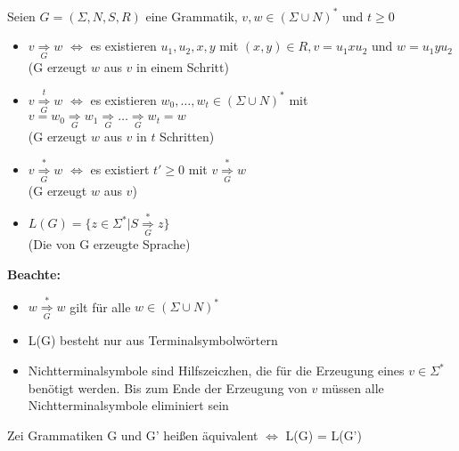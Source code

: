 \documentclass[14pt]{article}
\begin{document}
\begin{definition} 
    Seien $G =  (\varSigma, N, S, R)$ eine Grammatik, $v, w \in (\varSigma \cup N)^*$
    und $t \geq 0$
    \begin{itemize}
        \item $v \underset{G}{\Rightarrow} w$ $\Leftrightarrow$ es existieren $u_1, u_2, x, y$ 
        mit $(x, y) \in R, v = u_1xu_2$ und $w = u_1yu_2$ \\
        (G erzeugt $w$ aus $v$ in einem Schritt)
        \item $v \underset{G} {\overset{t}{\Rightarrow}} w$ $\Leftrightarrow$
        es existieren $w_0, \dots, w_t \in (\varSigma \cup N)^*$ mit \\
        $v = w_0 \underset{G}{\Rightarrow} w_1 \underset{G}{\Rightarrow} \dots 
        \underset{G}{\Rightarrow} w_t = w$ \\
        (G erzeugt $w$ aus $v$ in $t$ Schritten)
        \item $v \underset{G} {\overset{*}{\Rightarrow}} w$ $\Leftrightarrow$ 
        es existiert $t' \geq 0$ mit $v \underset{G} {\overset{*}{\Rightarrow}} w$ \\
        (G erzeugt $w$ aus $v$)
        \item $L(G) = \{ z \in \varSigma^* | S \underset{G} {\overset{*}{\Rightarrow}} z\}$ \\
        (Die von G erzeugte Sprache)
    \end{itemize}
    \textbf{Beachte:} \\
    \begin{itemize}
        \item $w \underset{G} {\overset{*}{\Rightarrow}} w$ gilt für alle $w \in (\varSigma \cup 
        N)^*$
        \item L(G) besteht nur aus Terminalsymbolwörtern
        \item Nichtterminalsymbole sind Hilfszeiczhen, die für die Erzeugung eines $v \in 
        \varSigma^*$ benötigt werden. Bis zum Ende der Erzeugung von $v$ müssen alle
        Nichtterminalsymbole eliminiert sein
    \end{itemize}
\end{definition}
\begin{definition} 
    Zei Grammatiken G und G' heißen äquivalent $\Leftrightarrow$ L(G) = L(G')
\end{definition}
\end{document}
